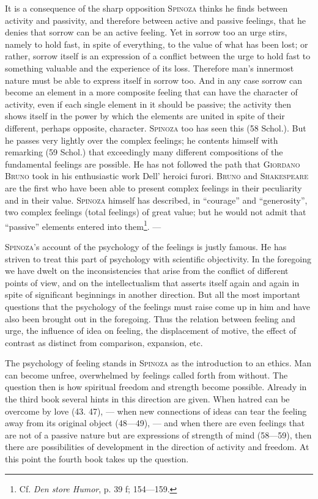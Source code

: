 \documentclass[12pt]{article}
\newcommand{\opage}[1]{\marginnote{\footnotesize\textit{[#1]}}}
\begin{document}
It is a consequence of the sharp opposition \textsc{Spinoza} thinks he finds between activity and
passivity, and therefore between active and passive feelings, that he denies that sorrow can be an
active feeling. Yet in sorrow too an urge stirs, \opage{69}namely to hold fast, in spite of
everything, to the value of what has been lost; or rather, sorrow itself is an expression of a
conflict between the urge to hold fast to something valuable and the experience of its loss.
Therefore man's innermost nature must be able to express itself in sorrow too. And in any case
sorrow can become an element in a more composite feeling that can have the character of activity,
even if each single element in it should be passive; the activity then shows itself in the power by
which the elements are united in spite of their different, perhaps opposite, character.
\textsc{Spinoza} too has seen this (58 Schol.). But he passes very lightly over the complex
feelings; he contents himself with remarking (59 Schol.) that exceedingly many different
compositions of the fundamental feelings are possible. He has not followed the path that
\textsc{Giordano Bruno} took in his enthusiastic work Dell' heroici furori. \textsc{Bruno} and
\textsc{Shakespeare} are the first who have been able to present complex feelings in their
peculiarity and in their value. %
\textsc{Spinoza} himself has described, in ``courage'' and ``generosity'', two complex feelings
(total feelings) of great value; but he would not admit that ``passive'' elements entered into
them\footnote{Cf. \textit{Den store Humor}, p. 39 f; 154---159.}. ---

\textsc{Spinoza}'s account of the psychology of the feelings is justly famous. He has striven to
treat this part of psychology with scientific objectivity. In the foregoing we have dwelt on the
inconsistencies that arise from the conflict of different points of view, and on the
intellectualism that asserts itself again and again in spite of significant beginnings in another
direction. But all the most important questions that the psychology of the feelings must raise come
up in him and have also been brought out in the foregoing. Thus the relation between feeling and
urge, the influence of idea on feeling, the displacement of motive, the effect of contrast as
distinct from comparison, expansion, etc.

The psychology of feeling stands in \textsc{Spinoza} as the introduction to an ethics. Man can
become unfree, overwhelmed by feelings called forth from without. The question then is how
spiritual freedom and strength become possible. Already in the third book several hints in this
direction are given. When hatred can be overcome by love (43. 47), --- when new connections of
ideas can tear the feeling away from its original object (48---49), --- and when there are even
feelings that are not of a passive nature but are expressions of strength of mind (58---59), then
there are possibilities of development in the direction of activity and freedom. At this point the
fourth book takes up the question.
\end{document}
